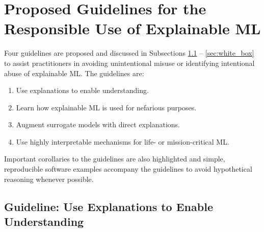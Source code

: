 \documentclass{article}
\begin{document}
\section{Proposed Guidelines for the Responsible Use of Explainable ML}

Four guidelines are proposed and discussed in Subsections \ref{sec:trust} -- \ref{sec:white_box} to assist practitioners in avoiding unintentional misuse or identifying intentional abuse of explainable ML. The guidelines are: 

\begin{enumerate}

\item Use explanations to enable understanding.
\item Learn how explainable ML is used for nefarious purposes.
\item Augment surrogate models with direct explanations.
\item Use highly interpretable mechanisms for life- or mission-critical ML.

\end{enumerate}

\noindent Important corollaries to the guidelines are also highlighted and simple, reproducible software examples accompany the guidelines to avoid hypothetical reasoning whenever possible. 

\subsection{Guideline: Use Explanations to Enable Understanding} \label{sec:trust}
\end{document}
